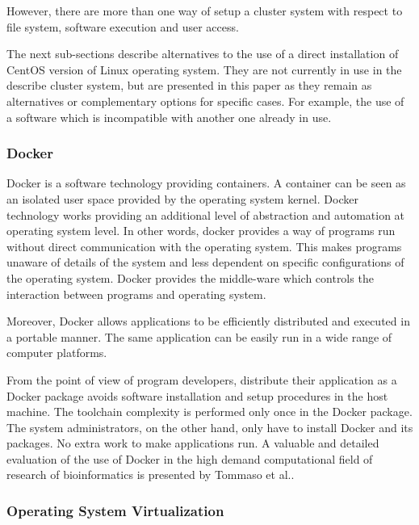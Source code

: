 \documentclass[twoside,a4paper,12pt,english]{inac17}
\begin{document}
However, there are more than one way of setup a cluster system with respect
to file system, software execution and user access.

The next sub-sections describe alternatives to the use of a direct installation of CentOS version of Linux operating system.
They are not currently in use in the describe cluster system, but are presented in this paper as they remain as alternatives
or complementary options for specific cases. For example, the use of a software which is incompatible with another one already
in use.

\subsubsection{Docker}
\label{ssub:dock}

Docker is a software technology providing containers. A container can be seen as an isolated user space provided by the operating system
kernel. Docker technology works providing an additional level of abstraction and automation at operating system level. In other words,
docker provides a way of programs run without direct communication with the operating system. This makes programs unaware of details of the
system and less dependent on specific configurations of the operating system. Docker provides the middle-ware which controls the interaction
between programs and operating system.

Moreover, Docker allows applications to be efficiently distributed and executed in a portable manner. The same application can be easily
run in a wide range of computer platforms\cite{Boettiger}.

From the point of view of program developers, distribute their application as a Docker package avoids software installation and
setup procedures in the host machine. The toolchain complexity is performed only once in the Docker package. The system administrators,
on the other hand, only have to install Docker and its packages. No extra work to make applications run. A valuable and detailed evaluation
of the use of Docker in the high demand computational field of research of bioinformatics is presented by Tommaso et al.\cite{Tommaso}.

\subsubsection{Operating System Virtualization}
\label{ssub:virt}
\end{document}
